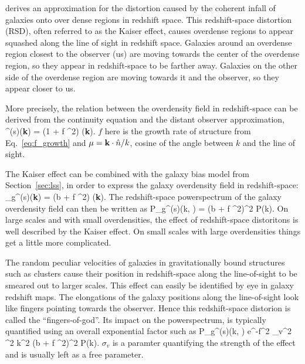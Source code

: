  derives an approximation for the distortion caused by the coherent 
infall of galaxies onto over dense regions in redshift space. This redshift-space 
distortion (RSD), often referred to as the Kaiser effect, causes overdense regions
to appear squashed along the line of sight in redshift space. Galaxies around an
overdense region closest to the observer (us) are moving towards the center of the 
overdense region, so they appear in redshift-space to be farther away. Galaxies 
on the other side of the overdense region are moving towards it and the observer, 
so they appear closer to us. 

More precisely, the relation between the overdensity field in redshift-space can be 
derived from the continuity equation and the distant observer approximation, 
\beq
\delta^{(s)}({\bf k}) = (1 + f \mu^2) \delta({\bf k}).
\eeq
$f$ here is the growth rate of structure from Eq.~\ref{eq:f_growth} and 
$\mu = {\bf k} \cdot \hat{n} / k$, cosine of the angle between $k$ and 
the line of sight. 

The Kaiser effect can be combined with the galaxy bias model from 
Section~\ref{sec:lss}, in order to express the galaxy overdensity field in 
redshift-space:
\beq
\delta_g^{(s)}({\bf k}) = (b + f \mu^2) \delta({\bf k}).
\eeq
The redshift-space powerspectrum of the galaxy overdensity field can then be
written as 
\beq
P_g^{(s)}(k, \mu) = (b + f \mu^2)^2 P(k).
\eeq
On large scales and with small overdensities, the effect of redshift-space 
distoritons is well described by the Kaiser effect. On small scales with large
overdensities things get a little more complicated. 

The random peculiar velocities of galaxies in gravitationally bound structures 
such as clusters cause their position in redshift-space along the line-of-sight 
to be smeared out to larger scales.  This effect can easily be identified by 
eye in galaxy redshift maps. The elongations of the galaxy positions along the 
line-of-sight look like fingers pointing towards the observer. Hence this 
redshift-space distorion is called the ``fingers-of-god''. Its impact on the 
powerspectrum, is typically quantified using an overall exponential factor such as 
\beq
P_g^{(s)}(k, \mu) \approx e^{-f^2 \sigma_v^2 \mu^2 k^2} (b + f \mu^2)^2 P(k).
\eeq
$\sigma_v$ is a paramter quantifying the strength of the effect and is usually
left as a free parameter. 

